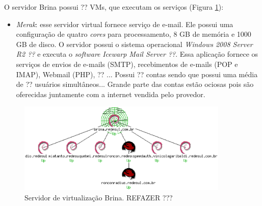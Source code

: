 O servidor Brina possui ?? \ac{VM}s, que executam os serviços (Figura \ref{fig:servlog1}):
\begin{itemize}
 \item \textit{Merak}: esse servidor virtual fornece serviço de e-mail. Ele possui uma configuração de quatro \textit{cores} para processamento, 
 8 GB de memória e 1000 GB de disco. O servidor possui o sistema operacional \textit{Windows 2008 Server R2 ??} e executa o \textit{software} 
 \textit{Icewarp Mail Server ??}. Essa aplicação fornece os serviços de envios de e-mails (\ac{SMTP}), recebimentos de e-mails (\ac{POP} e 
 \ac{IMAP}), Webmail (\ac{PHP}), ?? ... Possui ?? contas sendo que possui uma média de ?? usuários simultâneos...
 Grande parte das contas estão ociosas pois são oferecidas juntamente com a internet vendida pelo provedor.

\end{itemize}

\begin{figure}[h!]
 \centering
 \includegraphics[width=380px]{img/servlog1.eps}
 \caption{Servidor de virtualização Brina. REFAZER ???}
 \label{fig:servlog1}
\end{figure}

